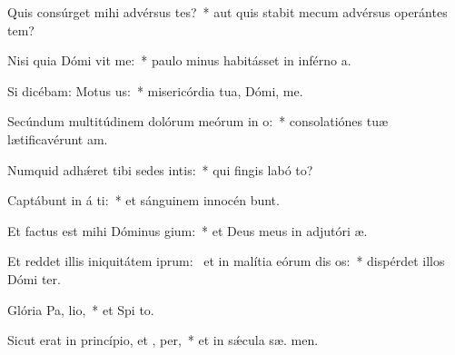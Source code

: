 \item Quis consúrget mihi advérsus tes?~* aut quis stabit mecum advérsus operántes tem?
\item Nisi quia Dómi vit me:~* paulo minus habitásset in inférno  a.
\item Si dicébam: Motus   us:~* misericórdia tua, Dómi,  me.
\item Secúndum multitúdinem dolórum meórum in  o:~* consolatiónes tuæ lætificavérunt  am.
\item Numquid adhǽret tibi sedes intis:~* qui fingis labó  to?
\item Captábunt in á ti:~* et sánguinem innocén bunt.
\item Et factus est mihi Dóminus  gium:~* et Deus meus in adjutóri  æ.
\item Et reddet illis iniquitátem iprum:~\pscross{} et in malítia eórum dis os:~* dispérdet illos Dómi  ter.
\item Glória Pa,  lio,~* et Spi to.
\item Sicut erat in princípio, et ,  per,~* et in sǽcula sæ. men.
